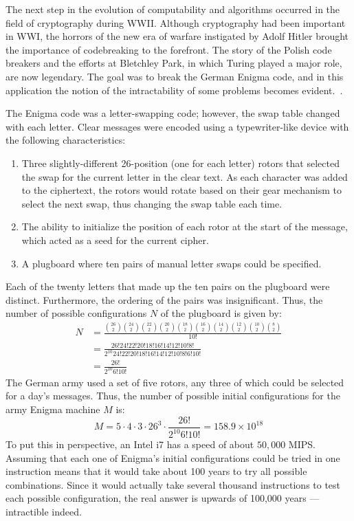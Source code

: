 The next step in the evolution of computability and algorithms occurred in the field of cryptography during WWII.
Although cryptography had been important in WWI, the horrors of the new era of warfare instigated by Adolf Hitler
brought the importance of codebreaking to the forefront.  The story of the Polish code breakers and the efforts at
Bletchley Park, in which Turing played a major role, are now legendary.  The goal was to break the German Enigma
code, and in this application the notion of the intractability of some problems becomes evident.~\cite{dturing}.

The Enigma code was a letter-swapping code; however, the swap table changed with each letter.  Clear messages were
encoded using a typewriter-like device with the following characteristics:

\begin{enumerate}
\item Three slightly-different 26-position (one for each letter) rotors that selected the swap for the current
  letter in the clear text.  As each character was added to the ciphertext, the rotors would rotate based on their
  gear mechanism to select the next swap, thus changing the swap table each time.
\item The ability to initialize the position of each rotor at the start of the message, which acted as a seed for the
  current cipher.
\item A plugboard where ten pairs of manual letter swaps could be specified.
\end{enumerate}

Each of the twenty letters that made up the ten pairs on the plugboard were distinct.  Furthermore, the ordering of
the pairs was insignificant. Thus, the number of possible configurations \(N\) of the plugboard is given by:
\begin{align*}
  N &= \frac{\binom{26}{2}\binom{24}{2}\binom{22}{2}\binom{20}{2}\binom{18}{2}
  \binom{16}{2}\binom{14}{2}\binom{12}{2}\binom{10}{2}\binom{8}{2}}{10!} \\
  &=\frac{26!24!22!20!18!16!14!12!10!8!}{2^{10}24!22!20!18!16!14!12!10!8!6!10!} \\
  &=\frac{26!}{2^{10}6!10!}
\end{align*}
The German army used a set of five rotors, any three of which could be selected for a day's messages.  Thus, the
number of possible initial configurations for the army Enigma machine \(M\) is:
\[M=5\cdot4\cdot3\cdot26^3\cdot\frac{26!}{2^{10}6!10!}=158.9\times10^{18}\]
To put this in perspective, an Intel i7 has a speed of about \(50,000\) MIPS.  Assuming that each one of Enigma's
initial configurations could be tried in one instruction means that it would take about 100 years to try all possible
combinations.  Since it would actually take several thousand instructions to test each possible configuration, the
real answer is upwards of 100,000 years --- intractible indeed.


